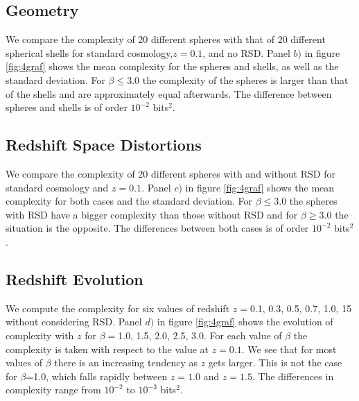 \documentclass[fleqn,usenatbib]{mnras}
\begin{document}
\subsection{Geometry}

We compare the complexity of 20 different spheres with that of 20 different spherical shells for standard cosmology,$z=0.1$, and no RSD. Panel $b)$ in figure \ref{fig:4graf} shows the mean complexity for the spheres and shells, as well as the standard deviation. For $\beta\leq3.0$ the complexity of the spheres is larger than that of the shells and are approximately equal afterwards. The difference between spheres and shells is of order $10^{-2}$ bits$^{2}$.




\subsection{Redshift Space Distortions}

We compare the complexity of 20 different spheres with and without RSD for standard cosmology and $z=0.1$. Panel $c)$ in figure \ref{fig:4graf} shows the mean complexity for both cases and the standard deviation. For $\beta\leq3.0$ the spheres with RSD have a bigger complexity than those without RSD and for $\beta\geq3.0$ the situation is the opposite. The differences between both cases is of order $10^{-2}$ bits$^2$.


\subsection{Redshift Evolution}
We compute the complexity for six values of redshift $z=$0.1, 0.3, 0.5, 0.7, 1.0, 15 without considering RSD. Panel $d)$ in figure \ref{fig:4graf} shows the evolution of complexity with $z$ for $\beta=$1.0, 1.5, 2.0, 2.5, 3.0. For each value of $\beta$ the complexity is taken with respect to the value at $z=0.1$. We see that for most values of $\beta$ there is an increasing tendency as $z$ gets larger. This is not the case for $\beta$=1.0, which falls rapidly between $z=1.0$ and $z=1.5$. The differences in complexity range from $10^{-2}$ to $10^{-3}$ bits$^2$.
\end{document}

